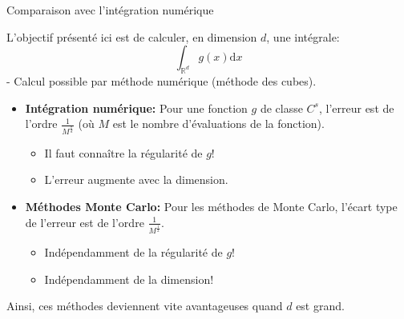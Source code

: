 \documentclass[ignorenonframetext,]{beamer}
\providecommand{\tightlist}{%
  \setlength{\itemsep}{0pt}\setlength{\parskip}{0pt}}
\begin{document}
\begin{frame}{Comparaison avec l'intégration numérique}
\protect\hypertarget{comparaison-avec-lintuxe9gration-numuxe9rique}{}

L'objectif présenté ici est de calculer, en dimension \(d\), une
intégrale: \[\int_{\mathbb{R}^d} g(x) \text{d}x\] - Calcul possible par
méthode numérique (méthode des cubes).\pause

\begin{itemize}
\tightlist
\item
  \textbf{Intégration numérique:} Pour une fonction \(g\) de classe
  \(C^s\), l'erreur est de l'ordre \(\frac{1}{M^{\frac{s}{d}}}\) (où
  \(M\) est le nombre d'évaluations de la fonction).

  \begin{itemize}
  \tightlist
  \item
    Il faut connaître la régularité de \(g\)!
  \item
    L'erreur augmente avec la dimension.\pause
  \end{itemize}
\item
  \textbf{Méthodes Monte Carlo:} Pour les méthodes de Monte Carlo,
  l'écart type de l'erreur est de l'ordre \(\frac{1}{M^{\frac{1}{2}}}\).

  \begin{itemize}
  \tightlist
  \item
    Indépendamment de la régularité de \(g\)!
  \item
    Indépendamment de la dimension!
  \end{itemize}
\end{itemize}

Ainsi, ces méthodes deviennent vite avantageuses quand \(d\) est grand.

\end{frame}
\end{document}
